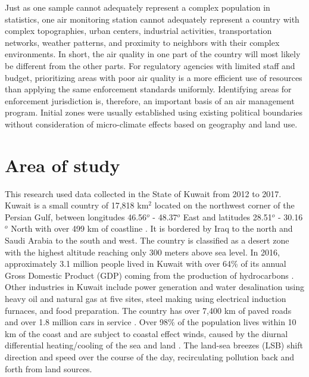 Just as one sample cannot adequately represent a complex population in statistics, one air monitoring station cannot adequately represent a country with complex topographies, urban centers, industrial activities, transportation networks, weather patterns, and proximity to neighbors with their complex environments.  In short, the air quality in one part of the country will most likely be different from the other parts. For regulatory agencies with limited staff and budget, prioritizing areas with poor air quality is a more efficient use of resources than applying the same enforcement standards uniformly. Identifying areas for enforcement jurisdiction is, therefore, an important basis of an air management program. Initial zones were usually established using existing political boundaries without consideration of micro-climate effects based on geography and land use.  

\section{Area of study}

This research used data collected in the State of Kuwait from 2012 to 2017. Kuwait is a small country of 17,818 km$^{2}$ located on the northwest corner of the Persian Gulf, between longitudes 46.56$^{o}$ - 48.37$^{o}$ East and latitudes 28.51$^{o}$ - 30.16$^{o}$ North with over 499 km of coastline \citep{CIA2015}. It is bordered by Iraq to the north and Saudi Arabia to the south and west. The country is classified as a desert zone with the highest altitude reaching only 300 meters above sea level.   In 2016, approximately 3.1 million people lived in Kuwait \citep{CSB2017} with over 64\% of its annual Gross Domestic Product (GDP) coming from the production of hydrocarbons \citep{KAMCO2013}.  Other industries in Kuwait include power generation and water desalination using heavy oil and natural gas at five sites, steel making using electrical induction furnaces, and food preparation.  The country has over 7,400 km of paved roads and over 1.8 million cars in service \citep{CSB2014}.  Over 98\% of the population lives within 10 km of the coast and are subject to coastal effect winds, caused by the diurnal differential heating/cooling of the sea and land \citep{Crosman2010, Cuxart2014}.  The land-sea breezes (LSB) shift direction and speed over the course of the day, recirculating pollution back and forth from land sources.

